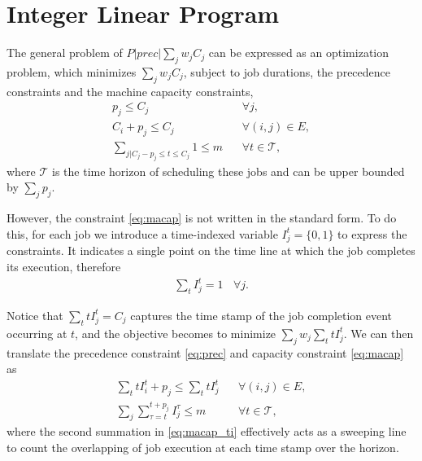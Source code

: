\section{Integer Linear Program} \label{s:ilp}
The general problem of $P|prec|\sum_j w_jC_j$ can be expressed as an optimization problem, which minimizes $\sum_j w_jC_j$, subject to job durations, the precedence constraints and the machine capacity constraints,
\begin{align}
p_j \leq C_j& \:\:\:\: \forall j, \label{eq:ptime}\\
C_i + p_j\leq C_j&  \:\:\:\: \forall (i,j) \in E, \label{eq:prec}\\
\sum_{j | C_j - p_j \leq t \leq C_j} 1 \leq m& \:\:\:\: \forall t \in \mathcal{T}, \label{eq:macap}
\end{align}
where $\mathcal{T}$ is the time horizon of scheduling these jobs and can be upper bounded by $\sum_j p_j$. 

However, the constraint \eqref{eq:macap} is not written in the standard form. To do this, for each job we introduce a time-indexed variable $I_j^t = \{0, 1\}$ to express the constraints. It indicates a single point on the time line at which the job completes its execution, therefore
\begin{align}
\sum_t I_j^t = 1 \:\:\:\: \forall j. 
\end{align}

Notice that $\sum_t tI_j^t = C_j$ captures the time stamp of the job completion event occurring at $t$, and the objective becomes to minimize $\sum_j w_j \sum_t tI_j^t$. We can then translate the precedence constraint \eqref{eq:prec} and capacity constraint \eqref{eq:macap} as 
\begin{align}
\sum_t t I^t_i + p_j \leq \sum_t tI^t_j& \:\:\:\: \forall (i,j) \in E, \label{eq:prec_ti}\\
\sum_{j} \sum_{\tau=t}^{t + p_j} I^\tau_j \leq m& \:\:\:\: \forall t \in \mathcal{T}, \label{eq:macap_ti}
\end{align}
where the second summation in \eqref{eq:macap_ti} effectively acts as a sweeping line to count the overlapping of job execution at each time stamp over the horizon. 

